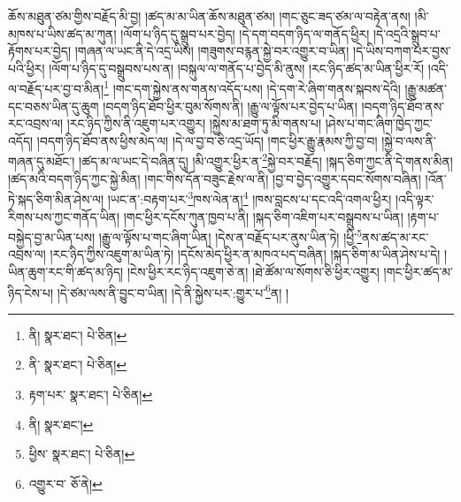 ཆོས་མཐུན་ཙམ་གྱིས་བརྗོད་མི་བྱ། །ཚད་མ་མ་ཡིན་ཆོས་མཐུན་ཙམ། །གང་ཅུང་ཟད་ཙམ་ལ་བརྟེན་ནས། །མི་མཁས་པ་ཡིས་ཚད་མ་ཀུན། །ལོག་པ་ཉིད་དུ་སྒྲུབ་པར་བྱེད། །དེ་དག་བདག་ཉིད་ལ་གནོད་ཕྱིར། །དེ་འདྲའི་སྒྲུབ་པ་རྟོགས་པར་བྱེད། །གཞན་ལ་ཡང་ནི་དེ་འདྲ་ཡིས། །གཟུགས་བརྙན་སྐྱེ་བར་འགྱུར་བ་ཡིན། །དེ་ཡིས་བཀག་པར་བྱས་པའི་ཕྱིར། །ལོག་པ་ཉིད་དུ་བསྒྲུབས་པས་ན། །བསྐུལ་ལ་གནོད་པ་བྱེད་མི་ནུས། །རང་ཉིད་ཚད་མ་ཡིན་ཕྱིར་རོ། །འདི་ལ་བརྗོད་པར་བྱ་བ་མིན།\footnote{ནི།  སྣར་ཐང་།  པེ་ཅིན། } །གང་དག་སྐྱེས་ནས་གནས་འདོད་པས། །དེ་དག་རེ་ཞིག་གནས་སྐབས་དེའི། །རྒྱུ་མཚན་དང་བཅས་ཡིན་དུ་ཆུག །བདག་ཉིད་ཐོབ་ཕྱིར་བུམ་སོགས་ནི། །རྒྱུ་ལ་ལྟོས་པར་བྱེད་པ་ཡིན། །བདག་ཉིད་ཐོབ་ནས་རང་འབྲས་ལ། །རང་ཉིད་ཀྱིས་ནི་འཇུག་པར་འགྱུར། །སྐྱེས་མ་ཐག་ཏུ་མི་གནས་པ། །ཤེས་པ་གང་ཞིག་ཁྱེད་ཀྱང་འདོད། །བདག་ཉིད་ཐོབ་ནས་ཕྱིས་མེད་ལ། །དེ་ལ་བྱ་བ་ཅི་འདྲ་ཡོད། །གང་ཕྱིར་རྒྱུ་རྣམས་ཀྱི་བྱ་བ། །སྐྱེ་བ་ལས་ནི་གཞན་དུ་མཐོང་། །ཚད་མ་ལ་ཡང་དེ་བཞིན་དུ། །མི་འགྱུར་ཕྱིར་ན་\footnote{ནི་  སྣར་ཐང་།  པེ་ཅིན། }སྐྱེ་བར་བརྗོད། །སྐད་ཅིག་ཀྱང་ནི་དེ་གནས་མིན། །ཚད་མའི་བདག་ཉིད་ཀྱང་སྐྱེ་མིན། །གང་གིས་དོན་བཟུང་རྗེས་ལ་ནི། །བྱ་བ་བྱེད་འགྱུར་དབང་སོགས་བཞིན། །འོན་ཏེ་སྐད་ཅིག་མིན་ཤེས་ལ། །ཡང་ན་:བརྟག་པར་\footnote{རྟག་པར་  སྣར་ཐང་།  པེ་ཅིན། }ཁས་ལེན་ན།\footnote{ནི།  སྣར་ཐང་། } །ཁས་བླངས་པ་དང་འདི་འགལ་ཕྱིར། །འདི་ལྟར་རིགས་པས་ཀྱང་གནོད་ཡིན། །གང་ཕྱིར་དངོས་ཀུན་ཁྱབ་པ་ནི། །སྐད་ཅིག་འཇིག་པར་བསྒྲུབས་པ་ཡིན། །རྟག་པ་བསྐྱེད་བྱ་མ་ཡིན་པས། །རྒྱུ་ལ་ལྟོས་པ་གང་ཞིག་ཡིན། །དེས་ན་བརྗོད་པར་ནུས་ཡིན་ཏེ། །ཕྱི་\footnote{ཕྱིས་  སྣར་ཐང་།  པེ་ཅིན། }ནས་ཚད་མ་རང་འབྲས་ལ། །རང་ཉིད་ཀྱིས་འཇུག་མ་ཡིན་ཏེ། །དངོས་མེད་ཕྱིར་ན་མཁའ་པད་བཞིན། །སྐད་ཅིག་མ་ཡིན་ཤེས་པ་དེ། །ཡིན་ཆུག་རང་གི་ཚད་མ་ཉིད། །ངེས་ཕྱིར་རང་ཉིད་འཇུག་ཅེ་ན། །ཐེ་ཚོམ་ལ་སོགས་ཅི་ཕྱིར་འགྱུར། །གང་ཕྱིར་ཚད་མ་ཉིད་ངེས་པ། །དེ་ཙམ་ལས་ནི་བྱུང་བ་ཡིན། །དེ་ནི་སྐྱེས་པར་:གྱུར་པ་\footnote{འགྱུར་བ་  ཅོ་ནེ། }ན། །
